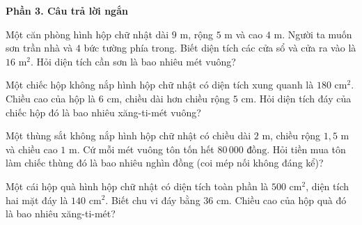 \textbf{Phần 3. Câu trả lời ngắn}

\begin{ex} %
Một căn phòng hình hộp chữ nhật dài $9\text{ m}$, rộng $5\text{ m}$ và cao $4\text{ m}$. Người ta muốn sơn trần nhà và $4$ bức tường phía trong. Biết diện tích các cửa sổ và cửa ra vào là $16\text{ m}^2$. Hỏi diện tích cần sơn là bao nhiêu mét vuông?
\end{ex}

\begin{ex} %
Một chiếc hộp không nắp hình hộp chữ nhật có diện tích xung quanh là $180\text{ cm}^2$. Chiều cao của hộp là $6\text{ cm}$, chiều dài hơn chiều rộng $5\text{ cm}$. Hỏi diện tích đáy của chiếc hộp đó là bao nhiêu xăng-ti-mét vuông?
\end{ex}

\begin{ex} %
Một thùng sắt không nắp hình hộp chữ nhật có chiều dài $2\text{ m}$, chiều rộng $1{,}5\text{ m}$ và chiều cao $1\text{ m}$. Cứ mỗi mét vuông tôn tốn hết $80\,000\text{ đồng}$. Hỏi tiền mua tôn làm chiếc thùng đó là bao nhiêu nghìn đồng (coi mép nối không đáng kể)?
\end{ex}

\begin{ex} %
Một cái hộp quà hình hộp chữ nhật có diện tích toàn phần là $500\text{ cm}^2$, diện tích hai mặt đáy là $140\text{ cm}^2$. Biết chu vi đáy bằng $36\text{ cm}$. Chiều cao của hộp quà đó là bao nhiêu xăng-ti-mét?
\end{ex}

